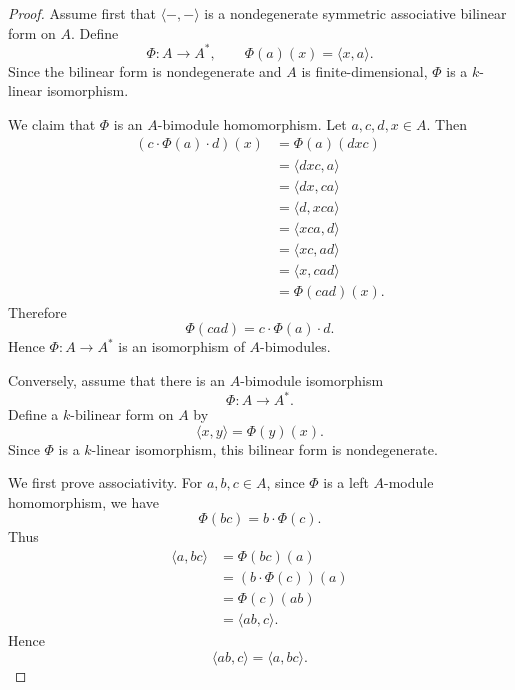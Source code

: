\begin{proof}
    Assume first that \(\langle -,-\rangle\) is a nondegenerate symmetric
    associative bilinear form on \(A\). Define
    \[
        \Phi:A\longrightarrow A^*,
        \qquad
        \Phi(a)(x)=\langle x,a\rangle .
    \]
    Since the bilinear form is nondegenerate and \(A\) is finite-dimensional,
    \(\Phi\) is a \(k\)-linear isomorphism.

    We claim that \(\Phi\) is an \(A\)-bimodule homomorphism. Let
    \(a,c,d,x\in A\). Then
    \[
        \begin{aligned}
            (c\cdot \Phi(a)\cdot d)(x)
             & =\Phi(a)(dxc)         \\
             & =\langle dxc,a\rangle \\
             & =\langle dx,ca\rangle \\
             & =\langle d,xca\rangle \\
             & =\langle xca,d\rangle \\
             & =\langle xc,ad\rangle \\
             & =\langle x,cad\rangle \\
             & =\Phi(cad)(x).
        \end{aligned}
    \]
    Therefore
    \[
        \Phi(cad)=c\cdot \Phi(a)\cdot d.
    \]
    Hence \(\Phi:A\to A^*\) is an isomorphism of \(A\)-bimodules.

    Conversely, assume that there is an \(A\)-bimodule isomorphism
    \[
        \Phi:A\longrightarrow A^*.
    \]
    Define a \(k\)-bilinear form on \(A\) by
    \[
        \langle x,y\rangle=\Phi(y)(x).
    \]
    Since \(\Phi\) is a \(k\)-linear isomorphism, this bilinear form is
    nondegenerate.

    We first prove associativity. For \(a,b,c\in A\), since \(\Phi\) is a left
    \(A\)-module homomorphism, we have
    \[
        \Phi(bc)=b\cdot \Phi(c).
    \]
    Thus
    \[
        \begin{aligned}
            \langle a,bc\rangle
             & =\Phi(bc)(a)           \\
             & =(b\cdot \Phi(c))(a)   \\
             & =\Phi(c)(ab)           \\
             & =\langle ab,c\rangle .
        \end{aligned}
    \]
    Hence
    \[
        \langle ab,c\rangle=\langle a,bc\rangle .
    \]


\end{proof}
